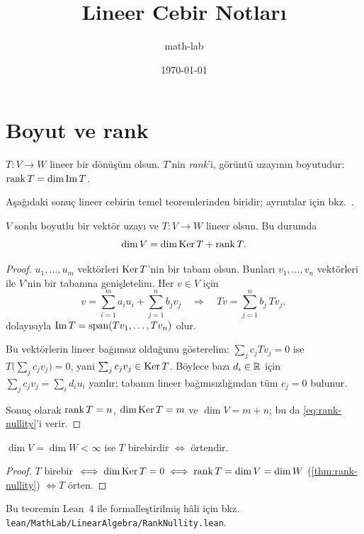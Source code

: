 \documentclass[11pt,a4paper]{article}
\title{Lineer Cebir Notları}
\author{math-lab}
\date{\today}
\begin{document}
\maketitle

\section{Boyut ve rank}

\begin{definition}\label{def:rank}
  $T \colon V \to W$ lineer bir dönüşüm olsun. $T$'nin \emph{rank}'i,
  görüntü uzayının boyutudur: $\operatorname{rank} T = \dim \operatorname{Im} T$.
\end{definition}

Aşağıdaki sonuç lineer cebirin temel teoremlerinden biridir;
ayrıntılar için bkz.~\cite{axler2024}.

\begin{theorem}\label{thm:rank-nullity}
  $V$ sonlu boyutlu bir vektör uzayı ve $T \colon V \to W$ lineer olsun. Bu durumda
  \begin{equation}\label{eq:rank-nullity}
    \dim V = \dim \operatorname{Ker} T + \operatorname{rank} T.
  \end{equation}
\end{theorem}

\begin{proof}
  $u_1, \dots, u_m$ vektörleri $\operatorname{Ker} T$'nin bir tabanı olsun. Bunları
  $v_1, \dots, v_n$ vektörleri ile $V$'nin bir tabanına genişletelim. Her $v \in V$ için
  \[
    v = \sum_{i=1}^{m} a_i u_i + \sum_{j=1}^{n} b_j v_j
    \quad\Longrightarrow\quad
    Tv = \sum_{j=1}^{n} b_j\, T v_j,
  \]
  dolayısıyla $\operatorname{Im} T = \operatorname{span}(Tv_1, \dots, Tv_n)$ olur.

  Bu vektörlerin lineer bağımsız olduğunu gösterelim: $\sum_j c_j T v_j = 0$
  ise $T\bigl(\sum_j c_j v_j\bigr) = 0$, yani $\sum_j c_j v_j \in \operatorname{Ker} T$.
  Böylece bazı $d_i \in \mathbb{R}$ için $\sum_j c_j v_j = \sum_i d_i u_i$ yazılır;
  tabanın lineer bağımsızlığından tüm $c_j = 0$ bulunur.

  Sonuç olarak $\operatorname{rank} T = n$, $\dim \operatorname{Ker} T = m$ ve $\dim V = m + n$; bu da
  \cref{eq:rank-nullity}'i verir.
\end{proof}

\begin{corollary}\label{cor:injective}
  $\dim V = \dim W < \infty$ ise $T$ birebirdir $\iff$ örtendir.
\end{corollary}

\begin{proof}
  $T$ birebir $\iff \dim \operatorname{Ker} T = 0 \iff \operatorname{rank} T = \dim V = \dim W$
  (\cref{thm:rank-nullity}) $\iff T$ örten.
\end{proof}

\begin{remark}
  Bu teoremin Lean~4 ile formalleştirilmiş hâli için bkz.\\
  \nolinkurl{lean/MathLab/LinearAlgebra/RankNullity.lean}.
\end{remark}



\end{document}
